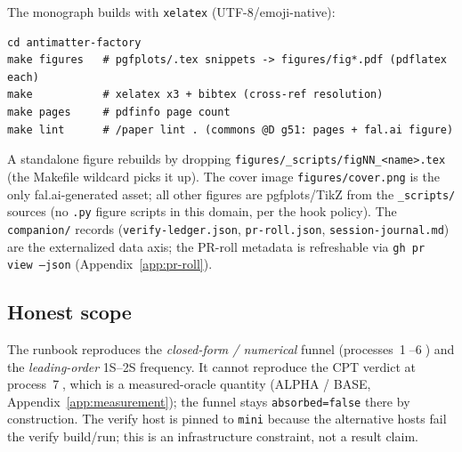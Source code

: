 The monograph builds with \texttt{xelatex} (UTF-8/emoji-native):
\begin{lstlisting}
cd antimatter-factory
make figures   # pgfplots/.tex snippets -> figures/fig*.pdf (pdflatex each)
make           # xelatex x3 + bibtex (cross-ref resolution)
make pages     # pdfinfo page count
make lint      # /paper lint . (commons @D g51: pages + fal.ai figure)
\end{lstlisting}
A standalone figure rebuilds by dropping
\texttt{figures/\_scripts/figNN\_<name>.tex} (the Makefile wildcard picks it
up). The cover image \texttt{figures/cover.png} is the only fal.ai-generated
asset; all other figures are pgfplots/TikZ from the \texttt{\_scripts/} sources
(no \texttt{.py} figure scripts in this domain, per the hook policy). The
\texttt{companion/} records (\texttt{verify-ledger.json}, \texttt{pr-roll.json},
\texttt{session-journal.md}) are the externalized data axis; the PR-roll
metadata is refreshable via \texttt{gh pr view --json}
(Appendix~\ref{app:pr-roll}).

\subsection{Honest scope}
\label{app:repro-scope}

The runbook reproduces the \emph{closed-form / numerical} funnel
(processes~\textcircled{\scriptsize 1}--\textcircled{\scriptsize 6}) and the
\emph{leading-order} 1S--2S frequency. It cannot reproduce the CPT verdict at
process~\textcircled{\scriptsize 7}, which is a measured-oracle quantity
(ALPHA / BASE, Appendix~\ref{app:measurement}); the funnel stays
\texttt{absorbed=false} there by construction. The verify host is pinned to
\texttt{mini} because the alternative hosts fail the verify build/run; this is
an infrastructure constraint, not a result claim.
